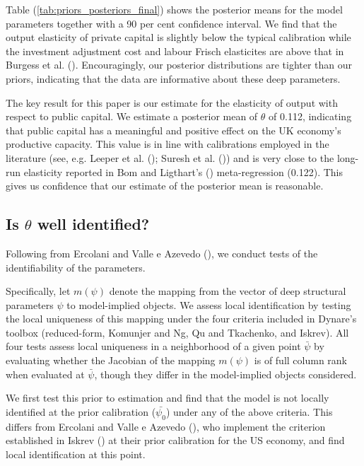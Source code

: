 \documentclass[titlepage, 11pt, a4paper]{article}
\renewcommand{\&}{and}
\begin{document}
Table (\ref{tab:priors_posteriors_final}) shows the posterior means for the model parameters together with a 90 per cent confidence interval. We find that the output elasticity of private capital is slightly below the typical calibration while the investment adjustment cost and labour Frisch elasticites are above that in Burgess et al. (\citeyear{burgess2013bank}). Encouragingly, our posterior distributions are tighter than our priors, indicating that the data are informative about these deep parameters.  

The key result for this paper is our estimate for the elasticity of output with respect to public capital. We estimate a posterior mean of $\theta$ of 0.112, indicating that public capital has a meaningful and positive effect on the UK economy's productive capacity. This value is in line with calibrations employed in the literature (see, e.g. Leeper et al. (\citeyear{leeper2010government}); Suresh et al. (\citeyear{Suresh24})) and is very close to the long-run elasticity reported in Bom and Ligthart's (\citeyear{bom2014have}) meta-regression (0.122). This gives us confidence that our estimate of the posterior mean is reasonable.



\subsection{Is $\theta$ well identified?}
Following from Ercolani and Valle e Azevedo (\citeyear{ercolani2014effects}), we conduct tests of the identifiability of the parameters. 

Specifically, let $m(\psi)$ denote the mapping from the vector of deep structural parameters $\psi$ to model-implied objects. We assess local identification by testing the local uniqueness of this mapping under the four criteria included in Dynare's toolbox (reduced-form, Komunjer and Ng, Qu and Tkachenko, and Iskrev). All four tests assess local uniqueness in a neighborhood of a given point $\bar{\psi}$ by evaluating whether the Jacobian of the mapping $m(\psi)$ is of full column rank when evaluated at $\bar{\psi}$, though they differ in the model-implied objects considered.

We first test this prior to estimation and find that the model is not locally identified at the prior calibration ($\bar{\psi_0}$) under any of the above criteria. This differs from Ercolani and Valle e Azevedo (\citeyear{ercolani2014effects}), who implement the criterion established in Iskrev (\citeyear{iskrev2010local})  at their prior calibration for the US economy, and find local identification at this point.
\end{document}
